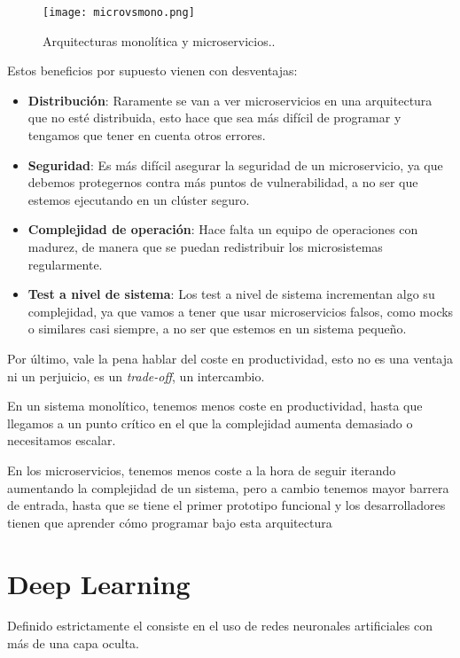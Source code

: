 \begin{figure}
	\centering
	\texttt{[image: microvsmono.png]}
	\caption[Arquitecturas monolítica y microservicios]{Arquitecturas monolítica y microservicios.\cite{fow14}.}\label{fig:microvsmono.png}
\end{figure}

Estos beneficios por supuesto vienen con desventajas:

\begin{itemize}
\item \textbf{Distribución}: Raramente se van a ver microservicios en una arquitectura que no esté distribuida, esto hace que sea más difícil de programar y tengamos que tener en cuenta otros errores.
\item \textbf{Seguridad}: Es más difícil asegurar la seguridad de un microservicio, ya que debemos protegernos contra más puntos de vulnerabilidad, a no ser que estemos ejecutando en un clúster seguro.
\item \textbf{Complejidad de operación}: Hace falta un equipo de operaciones con madurez, de manera que se puedan redistribuir los microsistemas regularmente.
\item \textbf{Test a nivel de sistema}: Los test a nivel de sistema incrementan algo su complejidad, ya que vamos a tener que usar microservicios falsos, como mocks o similares casi siempre, a no ser que estemos en un sistema pequeño.
\end{itemize}

Por último, vale la pena hablar del coste en productividad, esto no es una ventaja ni un perjuicio, es un \textit{trade-off}, un intercambio.

En un sistema monolítico, tenemos menos coste en productividad, hasta que llegamos a un punto crítico en el que la complejidad aumenta demasiado o necesitamos escalar.

En los microservicios, tenemos menos coste a la hora de seguir iterando aumentando la complejidad de un sistema, pero a cambio tenemos mayor barrera de entrada, hasta que se tiene el primer prototipo funcional y los desarrolladores tienen que aprender cómo programar bajo esta arquitectura

\section{Deep Learning}

Definido estrictamente el  consiste en el uso de redes neuronales artificiales con más de una capa oculta. 

